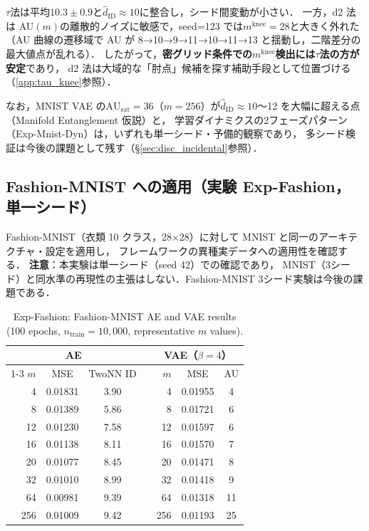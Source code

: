 \documentclass[11pt,a4paper]{jsarticle}
\newcommand{\AUsat}{\mathrm{AU}_{\mathrm{sat}}}
\newcommand{\mknee}{m^{\mathrm{knee}}}
\begin{document}
$\tau$法は平均$10.3 \pm 0.9$と$\hat{d}_\mathrm{ID} \approx 10$に整合し，シード間変動が小さい．
一方，d2 法は AU$(m)$の離散的ノイズに敏感で，seed=123 では$\mknee = 28$と大きく外れた
（AU 曲線の遷移域で AU が 8→10→9→11→10→11→13 と揺動し，二階差分の最大値点が乱れる）．
したがって，\textbf{密グリッド条件での$\mknee$検出には$\tau$法の方が安定}であり，
d2 法は大域的な「肘点」候補を探す補助手段として位置づける（\ref{app:tau_knee}参照）．

なお，MNIST VAE の$\AUsat = 36$（$m=256$）が$\hat{d}_\mathrm{ID} \approx 10$〜12 を大幅に超える点（Manifold Entanglement 仮説）と，
学習ダイナミクスの2フェーズパターン（Exp-Mnist-Dyn）は，いずれも単一シード・予備的観察であり，
多シード検証は今後の課題として残す（§\ref{sec:disc_incidental}参照）．

\subsection{Fashion-MNIST への適用（実験 Exp-Fashion，単一シード）}\label{sec:exp_fashion}

Fashion-MNIST（衣類 10 クラス，28×28）に対して MNIST と同一のアーキテクチャ・設定を適用し，
フレームワークの異種実データへの適用性を確認する．
\textbf{注意}：本実験は単一シード（seed 42）での確認であり，
MNIST（3シード）と同水準の再現性の主張はしない．Fashion-MNIST 3シード実験は今後の課題である．

\begin{table}[H]
\centering
\caption{Exp-Fashion: Fashion-MNIST AE and VAE results (100 epochs, $n_\mathrm{train}=10{,}000$, representative $m$ values).}
\label{tab:ef}
\small
\begin{tabular}{rcccrcc}
\toprule
\multicolumn{3}{c}{AE} & \phantom{xx} & \multicolumn{3}{c}{VAE（$\beta=4$）} \\
\cmidrule{1-3}\cmidrule{5-7}
$m$ & MSE & TwoNN ID && $m$ & MSE & AU \\
\midrule
 4  & 0.01831 & 3.90 && 4  & 0.01955 & 4  \\
 8  & 0.01389 & 5.86 && 8  & 0.01721 & 6  \\
12  & 0.01230 & 7.58 && 12 & 0.01597 & 6  \\
16  & 0.01138 & 8.11 && 16 & 0.01570 & 7  \\
20  & 0.01077 & 8.45 && 20 & 0.01471 & 8  \\
32  & 0.01010 & 8.99 && 32 & 0.01418 & 9  \\
64  & 0.00981 & 9.39 && 64 & 0.01318 & 11 \\
256 & 0.01009 & 9.42 && 256& 0.01193 & 25 \\
\bottomrule
\end{tabular}
\end{table}
\end{document}
